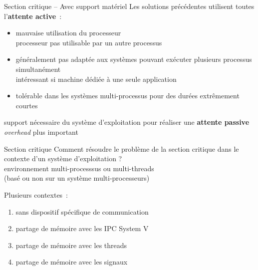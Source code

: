 \begin {frame} {Section critique -- Avec support matériel}
    Les solutions précédentes utilisent toutes l'\textbf {attente
    active}~:

    \begin {itemize}
	\item mauvaise utilisation du processeur \\
	    \implique processeur pas utilisable par un
		autre processus

	\item généralement pas adaptée aux systèmes pouvant exécuter
	    plusieurs processus simultanément \\
	    \implique intéressant si machine dédiée à une seule
	    application

	\item tolérable dans les systèmes multi-processus pour des
	    durées extrêmement courtes

    \end {itemize}

    \vspace* {3mm}

    \implique support nécessaire du système d'exploitation pour
    réaliser une \textbf {attente passive} \\
    \implique \emph {overhead} plus important

\end {frame}



\begin {frame} {Section critique}
    Comment résoudre le problème de la section critique dans
    le contexte d'un système d'exploitation ? \\
    \implique environnement multi-processsus ou multi-threads \\
    (basé ou non sur un système multi-processeurs)

    \vspace* {3mm}
    Plusieurs contextes~:
    \begin {enumerate}
	\item sans dispositif spécifique de communication
	\item partage de mémoire avec les IPC System V
	\item partage de mémoire avec les threads
	\item partage de mémoire avec les signaux
    \end {enumerate}

\end {frame}

